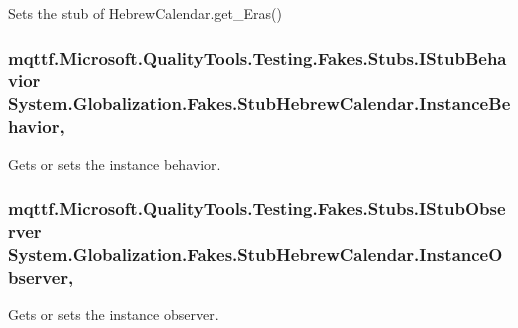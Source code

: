 Sets the stub of Hebrew\-Calendar.\-get\-\_\-\-Eras()

\hypertarget{class_system_1_1_globalization_1_1_fakes_1_1_stub_hebrew_calendar_a8128bc95f49cd276187961793f4eaefe}{
\subsubsection[{Instance\-Behavior}]{\setlength{\rightskip}{0pt plus 5cm}mqttf.\-Microsoft.\-Quality\-Tools.\-Testing.\-Fakes.\-Stubs.\-I\-Stub\-Behavior System.\-Globalization.\-Fakes.\-Stub\-Hebrew\-Calendar.\-Instance\-Behavior\hspace{0.3cm}{\ttfamily [get]}, {\ttfamily [set]}}}\label{class_system_1_1_globalization_1_1_fakes_1_1_stub_hebrew_calendar_a8128bc95f49cd276187961793f4eaefe}


Gets or sets the instance behavior.

\hypertarget{class_system_1_1_globalization_1_1_fakes_1_1_stub_hebrew_calendar_a9fbd5bcfaa4a0c3376ba9906398ce649}{
\subsubsection[{Instance\-Observer}]{\setlength{\rightskip}{0pt plus 5cm}mqttf.\-Microsoft.\-Quality\-Tools.\-Testing.\-Fakes.\-Stubs.\-I\-Stub\-Observer System.\-Globalization.\-Fakes.\-Stub\-Hebrew\-Calendar.\-Instance\-Observer\hspace{0.3cm}{\ttfamily [get]}, {\ttfamily [set]}}}\label{class_system_1_1_globalization_1_1_fakes_1_1_stub_hebrew_calendar_a9fbd5bcfaa4a0c3376ba9906398ce649}


Gets or sets the instance observer.

